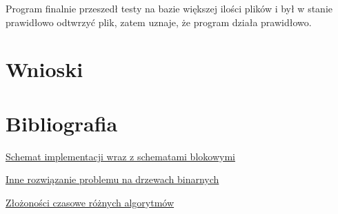 \documentclass{article}
\begin{document}
Program finalnie przeszedł testy na bazie większej ilości plików i był w stanie prawidłowo odtwrzyć plik, zatem
uznaje, że program działa prawidłowo.

\section{Wnioski}
\section{Bibliografia}
\href{https://eduinf.waw.pl/inf/alg/001_search/0106.php}{Schemat implementacji wraz z schematami blokowymi}

\href{https://bradfieldcs.com/algos/trees/priority-queues-with-binary-heaps/}{Inne rozwiązanie problemu na drzewach binarnych}

\href{https://www.hackerearth.com/practice/notes/heaps-and-priority-queues/}{Złożoności czasowe różnych algorytmów}
\end{document}
